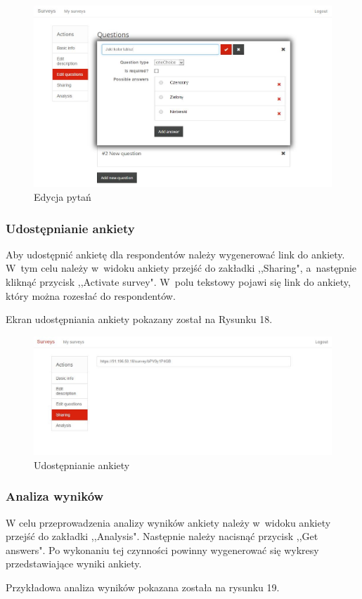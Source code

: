 \documentclass[12pt,a4paper,notitlepage]{article}
\begin{document}
\begin{figure}[H]
    \centering
    \includegraphics[width=\linewidth]{obrazy/edycjaPytan}
    \caption{Edycja pytań}
\end{figure} 

\subsubsection{Udostępnianie ankiety}
Aby udostępnić ankietę dla respondentów należy wygenerować link do ankiety. W~tym celu należy w~widoku ankiety przejść do zakładki ,,Sharing", a~następnie kliknąć przycisk ,,Activate survey". W~polu tekstowy pojawi się link do ankiety, który można rozesłać do respondentów.
\par Ekran udostępniania ankiety pokazany został na Rysunku 18.

\begin{figure}[H]
    \centering
    \includegraphics[width=\linewidth]{obrazy/sharing}
    \caption{Udostępnianie ankiety}
\end{figure} 

\subsubsection{Analiza wyników}
W celu przeprowadzenia analizy wyników ankiety należy w~widoku ankiety przejść do zakładki ,,Analysis". Następnie należy nacisnąć przycisk ,,Get answers". Po wykonaniu tej czynności powinny wygenerować się wykresy przedstawiające wyniki ankiety.
\par Przykładowa analiza wyników pokazana została na rysunku 19.
\end{document}
